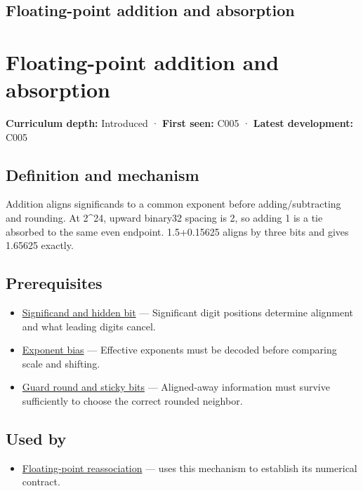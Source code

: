 \hypertarget{appendix-a1b1b4580dfd}{}
\section*{Floating-point addition and absorption}
\chapter{Floating-point addition and absorption}\label{appendix-a1b1b4580dfd-floating-point-addition-and-absorption}

\textbf{Curriculum depth:} Introduced · \textbf{First seen:} C005 · \textbf{Latest development:} C005

\section{Definition and mechanism}\label{appendix-a1b1b4580dfd-definition-and-mechanism}

Addition aligns significands to a common exponent before adding/subtracting and rounding. At 2\^{}24, upward binary32 spacing is 2, so adding 1 is a tie absorbed to the same even endpoint. 1.5+0.15625 aligns by three bits and gives 1.65625 exactly.

\section{Prerequisites}\label{appendix-a1b1b4580dfd-prerequisites}

\begin{itemize}
\tightlist
\item
  \hyperref[appendix-a24fd710cf67]{Significand and hidden bit} --- Significant digit positions determine alignment and what leading digits cancel.
\item
  \hyperref[appendix-2fae058c82e1]{Exponent bias} --- Effective exponents must be decoded before comparing scale and shifting.
\item
  \hyperref[appendix-b572b631069b]{Guard round and sticky bits} --- Aligned-away information must survive sufficiently to choose the correct rounded neighbor.
\end{itemize}

\section{Used by}\label{appendix-a1b1b4580dfd-used-by}

\begin{itemize}
\tightlist
\item
  \hyperref[appendix-c2ac4a84c283]{Floating-point reassociation} --- uses this mechanism to establish its numerical contract.
\end{itemize}

